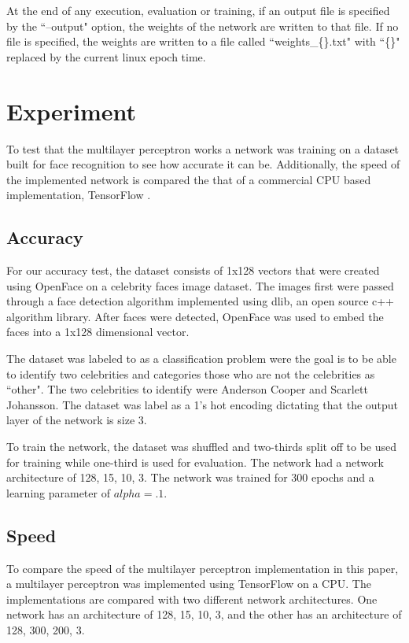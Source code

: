 \documentclass[jair, twoside,11pt,theapa]{article}
\begin{document}
At the end of any execution, evaluation or training, if an output file is specified by the ``--output" option, the weights of the network are written to that file. 
If no file is specified, the weights are written to a file called ``weights\_\{\}.txt" with ``\{\}" replaced by the current linux epoch time. 

\section{Experiment}
\label{Experiment}
To test that the multilayer perceptron works a network was training on a dataset built for face recognition to see how accurate it can be. 
Additionally, the speed of the implemented network is compared the that of a commercial CPU based implementation, TensorFlow \cite{tensorFlow}. 

\subsection{Accuracy}
For our accuracy test, the dataset consists of 1x128 vectors that were created using OpenFace \cite{openface} on a celebrity faces image dataset. 
The images first were passed through a face detection algorithm implemented using dlib, an open source c++ algorithm library. 
After faces were detected, OpenFace was used to embed the faces into a 1x128 dimensional vector. 

The dataset was labeled to as a classification problem were the goal is to be able to identify two celebrities and categories those who are not the celebrities as ``other".
The two celebrities to identify were Anderson Cooper and Scarlett Johansson. 
The dataset was label as a 1's hot encoding dictating that the output layer of the network is size 3. 

To train the network, the dataset was shuffled and two-thirds split off to be used for training while one-third is used for evaluation. 
The network had a network architecture of 128, 15, 10, 3. 
The network was trained for 300 epochs and a learning parameter of $alpha = .1$. 

\subsection{Speed}
To compare the speed of the multilayer perceptron implementation in this paper, a multilayer perceptron was implemented using TensorFlow on a CPU. 
The implementations are compared with two different network architectures. 
One network has an architecture of 128, 15, 10, 3, and the other has an architecture of 128, 300, 200, 3. 
\end{document}
